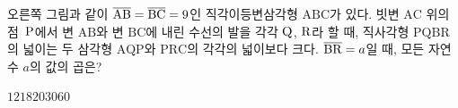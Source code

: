 \hspace*{2mm}\begin{minipage}[t]{\dimexpr\linewidth-2mm\relax}\vspace{0pt}
\noindent\begin{minipage}[t]{0.58\linewidth}\vspace{0pt}\raggedright 오른쪽 그림과 같이 $\overline{\mathrm{AB}}=\overline{\mathrm{BC}}=9$인 직각이등변삼각형 $\mathrm{ABC}$가 있다. 빗변 $\mathrm{AC}$ 위의 점~$\mathrm{P}$에서 변 $\mathrm{AB}$와 변 $\mathrm{BC}$에 내린 수선의 발을 각각 $\mathrm{Q}$, $\mathrm{R}$라 할 때, 직사각형 $\mathrm{PQBR}$의 넓이는 두 삼각형 $\mathrm{AQP}$와 $\mathrm{PRC}$의 각각의 넓이보다 크다. $\overline{\mathrm{BR}}=a$일 때, 모든 자연수 $a$의 값의 곱은?\end{minipage}\hfill\begin{minipage}[t]{0.4\linewidth}\vspace{0pt}\centering \resizebox{\ifdim\width>\linewidth\linewidth\else\width\fi}{!}{}\end{minipage}\par
\begin{choices32}{$12$}{$18$}{$20$}{$30$}{$60$}\end{choices32}\end{minipage}
